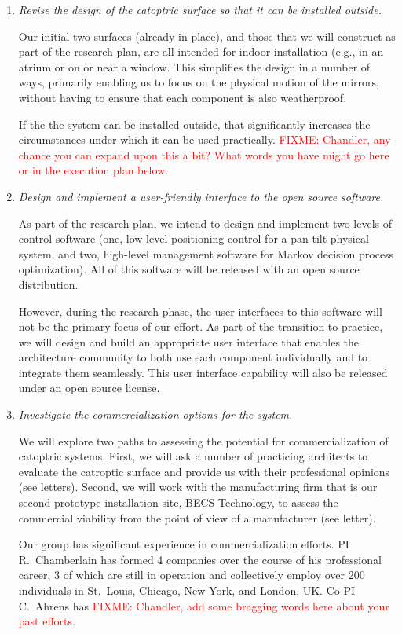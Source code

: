 \documentclass[11pt]{article}
\newcommand{\FIXME}[1]{\textcolor{red}{FIXME: #1}}
\begin{document}
\begin{enumerate}

\item \emph{Revise the design of the catoptric surface so that it can
be installed outside.}

Our initial two surfaces (already in place),
and those that we will construct as part of the research plan,
are all intended for indoor installation (e.g., in an atrium
or on or near a window.  This simplifies the design in a number of ways,
primarily enabling us to focus on the physical motion of the mirrors, without
having to ensure that each component is also weatherproof.

If the the system can be installed outside, that significantly increases
the circumstances under which it can be used practically.
\FIXME{Chandler, any chance you can expand upon this a bit? What words you have
might go here or in the execution plan below.}

\item \emph{Design and implement a user-friendly interface to the
open source software.}

As part of the research plan, we intend to design and implement two
levels of control software (one, low-level positioning control for a
pan-tilt physical system, and two, high-level management software for
Markov decision process optimization).  All of this software will be
released with an open source distribution.

However, during the research phase, the user interfaces to this software
will not be the primary focus of our effort.  As part of the transition
to practice, we will design and build an appropriate user interface that
enables the architecture community to both use each component individually
and to integrate them seamlessly.  This user interface capability will
also be released under an open source license.

\item \emph{Investigate the commercialization options for the system.}

We will explore two paths to assessing the potential for commercialization
of catoptric systems.
First, we will ask a number of practicing architects to evaluate the
catroptic surface and provide us with their professional opinions
(see letters).
Second, we will work with the manufacturing firm that is our second
prototype installation site, BECS Technology, to assess the commercial
viability from the point of view of a manufacturer (see letter).

Our group has significant experience in commercialization efforts.
PI R.~Chamberlain has formed 4 companies over the course of his professional
career, 3 of which are still in operation and collectively employ
over 200 individuals in St.~Louis, Chicago, New York, and London, UK.
Co-PI C.~Ahrens has \FIXME{Chandler, add some
bragging words here about your past efforts.}

\end{enumerate}
\end{document}
